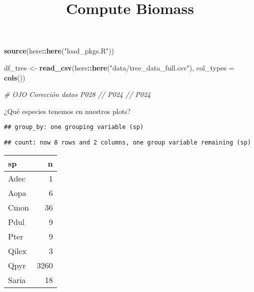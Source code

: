 \documentclass[]{article}
\title{Compute Biomass}
\author{}
\date{}
\newenvironment{Shaded}{\begin{snugshade}}{\end{snugshade}}
\newcommand{\CommentTok}[1]{\textcolor[rgb]{0.56,0.35,0.01}{\textit{#1}}}
\newcommand{\DataTypeTok}[1]{\textcolor[rgb]{0.13,0.29,0.53}{#1}}
\newcommand{\KeywordTok}[1]{\textcolor[rgb]{0.13,0.29,0.53}{\textbf{#1}}}
\newcommand{\NormalTok}[1]{#1}
\newcommand{\OperatorTok}[1]{\textcolor[rgb]{0.81,0.36,0.00}{\textbf{#1}}}
\newcommand{\StringTok}[1]{\textcolor[rgb]{0.31,0.60,0.02}{#1}}
\begin{document}
\maketitle

\begin{Shaded}
\begin{Highlighting}[]
\KeywordTok{source}\NormalTok{(here}\OperatorTok{::}\KeywordTok{here}\NormalTok{(}\StringTok{"load_pkgs.R"}\NormalTok{))}
\end{Highlighting}
\end{Shaded}

\begin{Shaded}
\begin{Highlighting}[]
\NormalTok{df_tree <-}\StringTok{ }\KeywordTok{read_csv}\NormalTok{(here}\OperatorTok{::}\KeywordTok{here}\NormalTok{(}\StringTok{"data/tree_data_full.csv"}\NormalTok{), }\DataTypeTok{col_types =} \KeywordTok{cols}\NormalTok{())}

\CommentTok{# OJO Corección datos P028 // P024 // P024 }
\end{Highlighting}
\end{Shaded}

¿Qué especies tenemos en nuestros plots?

\begin{Shaded}
\end{Shaded}

\begin{verbatim}
## group_by: one grouping variable (sp)
\end{verbatim}

\begin{verbatim}
## count: now 8 rows and 2 columns, one group variable remaining (sp)
\end{verbatim}

\begin{longtable}[]{@{}lr@{}}
\toprule
sp & n\tabularnewline
\midrule
\endhead
Adec & 1\tabularnewline
Aopa & 6\tabularnewline
Cmon & 36\tabularnewline
Pdul & 9\tabularnewline
Pter & 9\tabularnewline
Qilex & 3\tabularnewline
Qpyr & 3260\tabularnewline
Saria & 18\tabularnewline
\bottomrule
\end{longtable}
\end{document}
